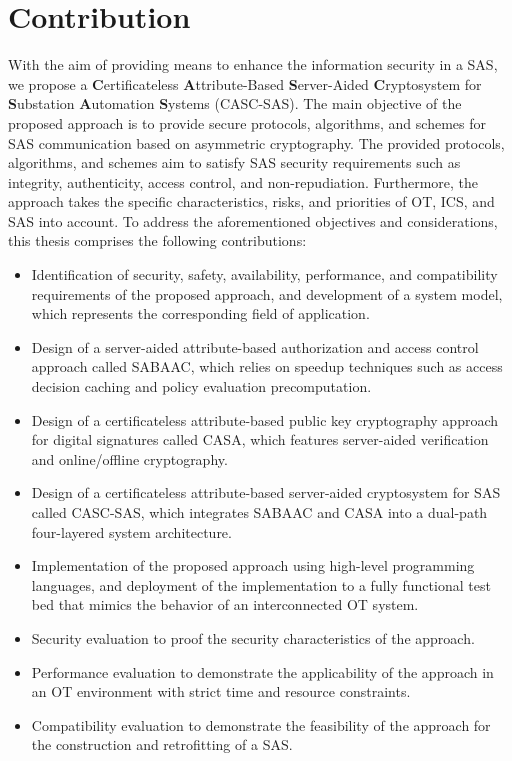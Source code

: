 \section{Contribution}
\label{sec:introduction:contribution}
With the aim of providing means to enhance the information security in a SAS, we propose a \textbf{C}ertificateless \textbf{A}ttribute-Based \textbf{S}erver-Aided \textbf{C}ryptosystem for \textbf{S}ubstation \textbf{A}utomation \textbf{S}ystems (CASC-SAS).
The main objective of the proposed approach is to provide secure protocols, algorithms, and schemes for SAS communication based on asymmetric cryptography.
The provided protocols, algorithms, and schemes aim to satisfy SAS security requirements such as integrity, authenticity, access control, and non-repudiation.
Furthermore, the approach takes the specific characteristics, risks, and priorities of OT, ICS, and SAS into account.
To address the aforementioned objectives and considerations, this thesis comprises the following contributions:
\begin{itemize}
    \item Identification of security, safety, availability, performance, and compatibility requirements of the proposed approach, and development of a system model, which represents the corresponding field of application.
    \item Design of a server-aided attribute-based authorization and access control approach called SABAAC, which relies on speedup techniques such as access decision caching and policy evaluation precomputation.
    \item Design of a certificateless attribute-based public key cryptography approach for digital signatures called CASA, which features server-aided verification and online/offline cryptography.
    \item Design of a certificateless attribute-based server-aided cryptosystem for SAS called CASC-SAS, which integrates SABAAC and CASA into a dual-path four-layered system architecture.
    \item Implementation of the proposed approach using high-level programming languages, and deployment of the implementation to a fully functional test bed that mimics the behavior of an interconnected OT system.
    \item Security evaluation to proof the security characteristics of the approach.
    \item Performance evaluation to demonstrate the applicability of the approach in an OT environment with strict time and resource constraints.
    \item Compatibility evaluation to demonstrate the feasibility of the approach for the construction and retrofitting of a SAS.
\end{itemize}

